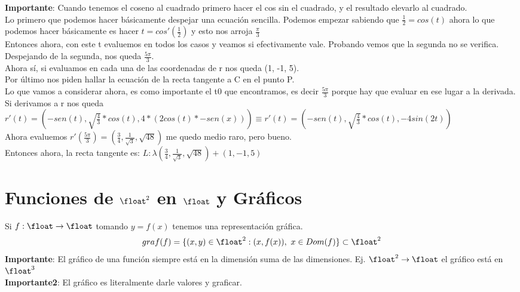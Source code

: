 \documentclass[10pt,a4paper]{article}
\begin{document}
\textbf{Importante}: Cuando tenemos el coseno al cuadrado primero hacer el cos sin el cuadrado, y el resultado elevarlo al cuadrado. \\
Lo primero que podemos hacer básicamente despejar una ecuación sencilla. Podemos empezar sabiendo que $\frac{1}{2} = cos(t)$ ahora lo que podemos hacer básicamente es hacer $t = cos'(\frac{1}{2})$ y esto nos arroja $\frac{\pi}{3}$ \\
Entonces ahora, con este t evaluemos en todos los casos y veamos si efectivamente vale. Probando vemos que la segunda no se verifica. \\
Despejando de la segunda, nos queda $\frac{5\pi}{3}$. \\
Ahora sí, si evaluamos en cada una de las coordenadas de r nos queda (1, -1, 5). \\
Por último nos piden hallar la ecuación de la recta tangente a C en el punto P. \\
Lo que vamos a considerar ahora, es como importante el t0 que encontramos, es decir $\frac{5\pi}{3}$ porque hay que evaluar en ese lugar a la derivada. \\
Si derivamos a r nos queda $r'(t) = (-sen(t), \sqrt{\frac{4}{3}} * cos(t), 4 * (2 cos(t) * -sen(x))) \equiv r'(t) = (-sen(t), \sqrt{\frac{4}{3}} * cos(t), -4 sin(2t)) $ \\
Ahora evaluemos $r'(\frac{5\pi}{3}) = (\frac{3}{4}, \frac{1}{\sqrt{3}}, \sqrt{48})$ me quedo medio raro, pero bueno. \\
Entonces ahora, la recta tangente es: $L : \lambda(\frac{3}{4}, \frac{1}{\sqrt{3}}, \sqrt{48}) + (1, -1, 5)$


\section*{Funciones de $\float^{2}$ en $\float$ y Gráficos}
Si $f:\float \rightarrow \float $ tomando $y=f(x)$ tenemos una representación gráfica. \\
\[graf(f) = \{(x,y) \in \float^{2} : (x, f(x)), \ x \in Dom(f)\} \subset \float^{2} \]
\textbf{Importante}: El gráfico de una función siempre está en la dimensión suma de las dimensiones. Ej. $\float^{2} \rightarrow \float$ el gráfico está en $\float^{3}$ \\
\textbf{Importante2}: El gráfico es literalmente darle valores y graficar.
\end{document}
